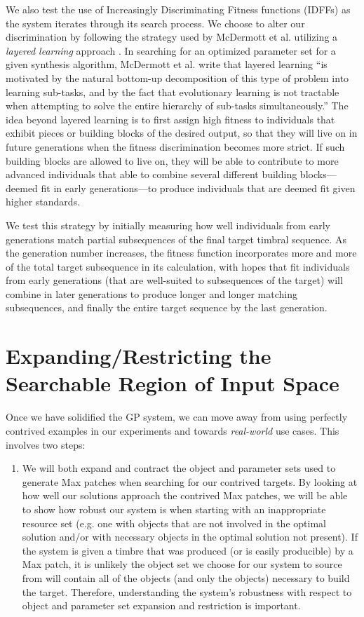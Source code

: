 \documentclass[12pt]{report} 	%
\numberwithin{figure}{chapter}
\numberwithin{table}{chapter}
\numberwithin{equation}{chapter}
\begin{document}
\begin{flushleft}
We also test the use of Increasingly Discriminating Fitness functions (IDFFs) as the system iterates through its search process. We choose to alter our discrimination by following the strategy used by McDermott et al. utilizing a \textit{layered learning} approach \cite[p. 3]{McDermott:2006jd}. In searching for an optimized parameter set for a given synthesis algorithm, McDermott et al. write that layered learning ``is motivated by the natural bottom-up decomposition of this type of problem into learning sub-tasks, and by the fact that evolutionary learning is not tractable when attempting to solve the entire hierarchy of sub-tasks simultaneously.'' The idea beyond layered learning is to first assign high fitness to individuals that exhibit pieces or building blocks of the desired output, so that they will live on in future generations when the fitness discrimination becomes more strict. If such building blocks are allowed to live on, they will be able to contribute to more advanced individuals that able to combine several different building blocks---deemed fit in early generations---to produce individuals that are deemed fit given higher standards.

We test this strategy by initially measuring how well individuals from early generations match partial subsequences of the final target timbral sequence. As the generation number increases, the fitness function incorporates more and more of the total target subsequence in its calculation, with hopes that fit individuals from early generations (that are well-suited to subsequences of the target) will combine in later generations to produce longer and longer matching subsequences, and finally the entire target sequence by the last generation.

\section{Expanding/Restricting the Searchable Region of Input Space}
Once we have solidified the GP system, we can move away from using perfectly contrived examples in our experiments and towards \textit{real-world} use cases. This involves two steps:

\begin{enumerate}
\item We will both expand and contract the object and parameter sets used to generate Max patches when searching for our contrived targets. By looking at how well our solutions approach the contrived Max patches, we will be able to show how robust our system is when starting with an inappropriate resource set (e.g. one with objects that are not involved in the optimal solution and/or with necessary objects in the optimal solution not present). If the system is given a timbre that was produced (or is easily producible) by a Max patch, it is unlikely the object set we choose for our system to source from will contain all of the objects (and only the objects) necessary to build the target. Therefore, understanding the system's robustness with respect to object and parameter set expansion and restriction is important.


\end{enumerate}
\end{flushleft}
\end{document}
